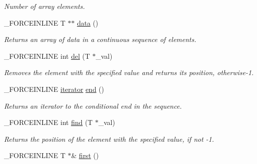 \begin{DoxyCompactItemize}
\begin{DoxyCompactList}\small\item\em Number of array elements. \end{DoxyCompactList}\item 
\hypertarget{classbt_1_1_sort_void_vector_a47f4668a4e67e8bb686c0206f9142591}{\-\_\-\-F\-O\-R\-C\-E\-I\-N\-L\-I\-N\-E T $\ast$$\ast$ \hyperlink{classbt_1_1_sort_void_vector_a47f4668a4e67e8bb686c0206f9142591}{data} ()}\label{classbt_1_1_sort_void_vector_a47f4668a4e67e8bb686c0206f9142591}

\begin{DoxyCompactList}\small\item\em Returns an array of data in a continuous sequence of elements. \end{DoxyCompactList}\item 
\hypertarget{classbt_1_1_sort_void_vector_afbe574fc4d5cba6f1677c907cc44fb4d}{\-\_\-\-F\-O\-R\-C\-E\-I\-N\-L\-I\-N\-E int \hyperlink{classbt_1_1_sort_void_vector_afbe574fc4d5cba6f1677c907cc44fb4d}{del} (T $\ast$\-\_\-val)}\label{classbt_1_1_sort_void_vector_afbe574fc4d5cba6f1677c907cc44fb4d}

\begin{DoxyCompactList}\small\item\em Removes the element with the specified value and returns its position, otherwise-\/1. \end{DoxyCompactList}\item 
\hypertarget{classbt_1_1_sort_void_vector_acb2d309a70c3f260bfe385c36f2cf759}{\-\_\-\-F\-O\-R\-C\-E\-I\-N\-L\-I\-N\-E \hyperlink{classbt_1_1_sort_void_vector_1_1iterator}{iterator} \hyperlink{classbt_1_1_sort_void_vector_acb2d309a70c3f260bfe385c36f2cf759}{end} ()}\label{classbt_1_1_sort_void_vector_acb2d309a70c3f260bfe385c36f2cf759}

\begin{DoxyCompactList}\small\item\em Returns an iterator to the conditional end in the sequence. \end{DoxyCompactList}\item 
\hypertarget{classbt_1_1_sort_void_vector_a0c18a2c334bf8009a5f1012795ee4660}{\-\_\-\-F\-O\-R\-C\-E\-I\-N\-L\-I\-N\-E int \hyperlink{classbt_1_1_sort_void_vector_a0c18a2c334bf8009a5f1012795ee4660}{find} (T $\ast$\-\_\-val)}\label{classbt_1_1_sort_void_vector_a0c18a2c334bf8009a5f1012795ee4660}

\begin{DoxyCompactList}\small\item\em Returns the position of the element with the specified value, if not -\/1. \end{DoxyCompactList}\item 
\hypertarget{classbt_1_1_sort_void_vector_afd34163f11a7320b40771e40a6554552}{\-\_\-\-F\-O\-R\-C\-E\-I\-N\-L\-I\-N\-E T $\ast$\& \hyperlink{classbt_1_1_sort_void_vector_afd34163f11a7320b40771e40a6554552}{first} ()}\label{classbt_1_1_sort_void_vector_afd34163f11a7320b40771e40a6554552}


\end{DoxyCompactItemize}
